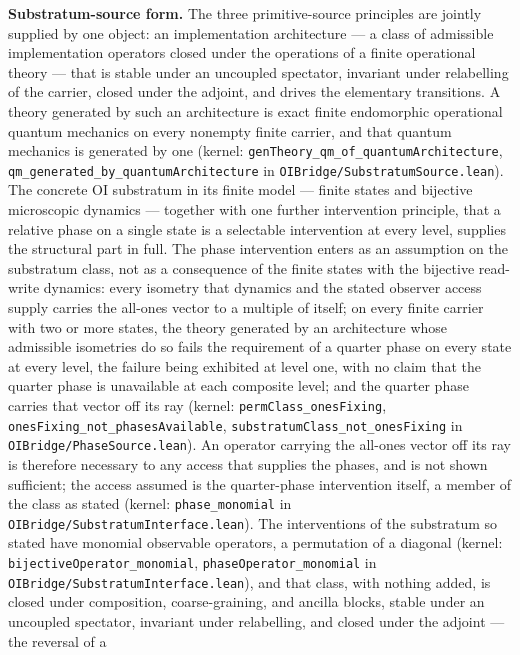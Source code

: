\documentclass[
]{article}
\begin{document}
\textbf{Substratum-source form.} The three primitive-source principles
are jointly supplied by one object: an implementation architecture --- a
class of admissible implementation operators closed under the operations
of a finite operational theory --- that is stable under an uncoupled
spectator, invariant under relabelling of the carrier, closed under the
adjoint, and drives the elementary transitions. A theory generated by
such an architecture is exact finite endomorphic operational quantum
mechanics on every nonempty finite carrier, and that quantum mechanics
is generated by one (kernel:
\texttt{genTheory\_qm\_of\_quantumArchitecture},
\texttt{qm\_generated\_by\_quantumArchitecture} in
\texttt{OIBridge/SubstratumSource.lean}). The concrete OI substratum in
its finite model --- finite states and bijective microscopic dynamics
--- together with one further intervention principle, that a relative
phase on a single state is a selectable intervention at every level,
supplies the structural part in full. The phase intervention enters as
an assumption on the substratum class, not as a consequence of the
finite states with the bijective read-write dynamics: every isometry
that dynamics and the stated observer access supply carries the all-ones
vector to a multiple of itself; on every finite carrier with two or more
states, the theory generated by an architecture whose admissible
isometries do so fails the requirement of a quarter phase on every state
at every level, the failure being exhibited at level one, with no claim
that the quarter phase is unavailable at each composite level; and the
quarter phase carries that vector off its ray (kernel:
\texttt{permClass\_onesFixing},
\texttt{onesFixing\_not\_phasesAvailable},
\texttt{substratumClass\_not\_onesFixing} in
\texttt{OIBridge/PhaseSource.lean}). An operator carrying the all-ones
vector off its ray is therefore necessary to any access that supplies
the phases, and is not shown sufficient; the access assumed is the
quarter-phase intervention itself, a member of the class as stated
(kernel: \texttt{phase\_monomial} in
\texttt{OIBridge/SubstratumInterface.lean}). The interventions of the
substratum so stated have monomial observable operators, a permutation
of a diagonal (kernel: \texttt{bijectiveOperator\_monomial},
\texttt{phaseOperator\_monomial} in
\texttt{OIBridge/SubstratumInterface.lean}), and that class, with
nothing added, is closed under composition, coarse-graining, and ancilla
blocks, stable under an uncoupled spectator, invariant under
relabelling, and closed under the adjoint --- the reversal of a
\end{document}

